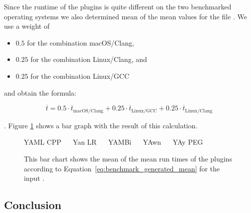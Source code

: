 Since the runtime of the plugins is quite different on the two benchmarked operating systems we also determined mean of the mean values for the file \FileGenerated{}. We use a weight of

\begin{itemize}
  \item $0.5$ for the combination macOS/Clang,
  \item $0.25$ for the combination Linux/Clang, and
  \item $0.25$ for the combination Linux/GCC
\end{itemize}

and obtain the formula:

\begin{equation}
  \overline{t} = 0.5  · \overline{t}_{\text{macOS/Clang}} +
                 0.25 · \overline{t}_{\text{Linux/GCC}} +
                 0.25 · \overline{t}_{\text{Linux/Clang}}
  \label{eq:benchmark_generated_mean}
\end{equation}

. Figure \ref{fig:benchmark_generated_mean} shows a bar graph with the result of this calculation.

\begin{figure}[H]
  \begin{bchart}[max=300, width=0.8\textwidth, unit=ms]





  \end{bchart}
  \begin{center}
  \vspace{-0.5cm}
     YAML CPP ~~
     Yan LR ~~
     YAMBi ~~
     YAwn ~~
     YAy PEG
  \vspace{-0.5cm}
  \end{center}
  \caption{This bar chart shows the mean of the mean run times of the plugins according to Equation~\ref{eq:benchmark_generated_mean} for the input \FileGenerated{}.}
  \label{fig:benchmark_generated_mean}
\end{figure}

\subsection{Conclusion}

